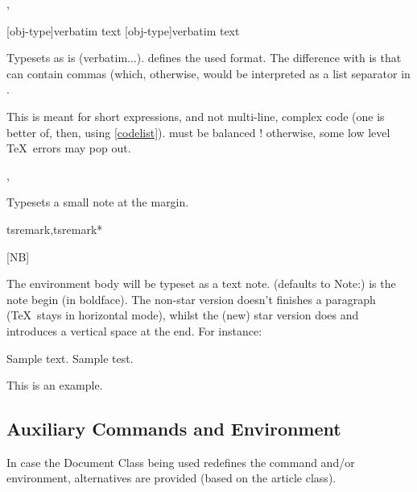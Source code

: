 \documentclass{article}
\begin{document}
\begin{codedescribe}[code]{\typesetverb,\tsverb}
\begin{codesyntax}
\tsmacro{\typesetverb}[obj-type]{verbatim text}
\tsmacro{\tsverb}[obj-type]{verbatim text}
\end{codesyntax}
 Typesets  as is (verbatim...).  defines the used format. The difference with  is that  can contain commas (which, otherwise, would be interpreted as a list separator in \tsobj{\tsobj}.
\end{codedescribe}
\begin{tsremark}
This is meant for short expressions, and not multi-line, complex code (one is better of, then, using \ref{codelist}).   must be balanced ! otherwise, some low level \TeX\ errors may pop out.
\end{tsremark}


\begin{codedescribe}[code]{\typesetmarginnote,\tsmarginnote}
\begin{codesyntax}
\end{codesyntax}
Typesets a small note at the margin.
\end{codedescribe}

\begin{codedescribe}[env,update=2025-04-21]{tsremark,tsremark*}
\begin{codesyntax}
\tsmacro{\begin{tsremark}}[NB]{}
\tsmacro{\end{tsremark}}{}
\end{codesyntax}
 The environment body will be typeset as a text note.  (defaults to Note:) is the note begin (in boldface). The non-star version doesn't finishes a paragraph (\TeX\ stays in horizontal mode), whilst the (new) star version does and introduces a vertical space at the end. For instance:
 \begin{codestore}
 Sample text. Sample test.
  \begin{tsremark}[N.B.]
    This is an example.
  \end{tsremark}
 \end{codestore}
\end{codedescribe}

\subsection{Auxiliary Commands and Environment}
In case the Document Class being used redefines the \tsobj[code]{\maketitle} command and/or  environment, alternatives are provided (based on the article class).
\end{document}
